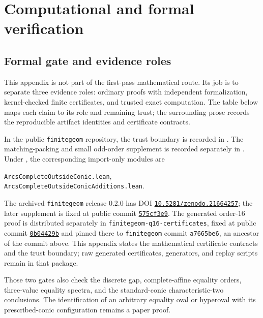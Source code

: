 \documentclass[11pt]{article}
\theoremstyle{definition}
\theoremstyle{remark}
\begin{document}
\section{Computational and formal verification}
\label{app:verification}

\subsection{Formal gate and evidence roles}

This appendix is not part of the first-pass mathematical route.  Its job is to
separate three evidence roles: ordinary proofs with independent formalization,
kernel-checked finite certificates, and trusted exact computation.  The table
below maps each claim to its role and remaining trust; the surrounding prose
records the reproducible artifact identities and certificate contracts.

In the public \texttt{finitegeom}
repository, the trust boundary is recorded in
.  The matching-packing and small
odd-order supplement is recorded separately in
.  Under
, the corresponding import-only modules are
\begin{center}
\small
\texttt{ArcsCompleteOutsideConic.lean},\\
\texttt{ArcsCompleteOutsideConicAdditions.lean}.
\end{center}
The archived \texttt{finitegeom} release 0.2.0 has DOI
\href{https://doi.org/10.5281/zenodo.21664257}
{\texttt{10.5281/zenodo.21664257}}; the later supplement is fixed at public
commit \href{https://github.com/tavisrudd/finitegeom/commit/575cf3e991168fb96eb24c318263c5d0552aa531}
{\texttt{575cf3e9}}.  The generated order-\(16\) proof is distributed
separately in \texttt{finitegeom-q16-certificates}, fixed at public commit
\href{https://github.com/tavisrudd/finitegeom-q16-certificates/commit/0b04429b6da2226f5cb53d299264cb782e54e000}
{\texttt{0b04429b}} and pinned there to \texttt{finitegeom} commit
\texttt{a7665be6}, an ancestor of the commit above.
This appendix states the mathematical certificate contracts and the trust
boundary; raw generated certificates, generators, and replay scripts remain
in that package.

Those two gates also check the discrete gap, complete-affine equality orders,
three-value equality spectra, and the standard-conic characteristic-two
conclusions.  The identification of an arbitrary equality oval or hyperoval
with its prescribed-conic configuration remains a paper proof.
\end{document}

